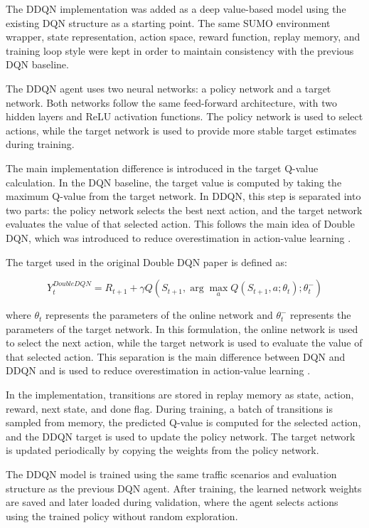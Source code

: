 \documentclass{article}
\begin{document}
The DDQN implementation was added as a deep value-based model using the existing DQN structure as a starting point. The same SUMO environment wrapper, state representation, action space, reward function, replay memory, and training loop style were kept in order to maintain consistency with the previous DQN baseline.

The DDQN agent uses two neural networks: a policy network and a target network. Both networks follow the same feed-forward architecture, with two hidden layers and ReLU activation functions. The policy network is used to select actions, while the target network is used to provide more stable target estimates during training.

The main implementation difference is introduced in the target Q-value calculation. In the DQN baseline, the target value is computed by taking the maximum Q-value from the target network. In DDQN, this step is separated into two parts: the policy network selects the best next action, and the target network evaluates the value of that selected action. This follows the main idea of Double DQN, which was introduced to reduce overestimation in action-value learning \cite{vanhasselt2016deep}.

The target used in the original Double DQN paper is defined as:

\[
Y_t^{DoubleDQN} =
R_{t+1} + \gamma Q\left(S_{t+1},
\arg\max_a Q(S_{t+1}, a; \theta_t);
\theta_t^{-}\right)
\]

where $\theta_t$ represents the parameters of the online network and
$\theta_t^{-}$ represents the parameters of the target network. In this
formulation, the online network is used to select the next action, while
the target network is used to evaluate the value of that selected action.
This separation is the main difference between DQN and DDQN and is used
to reduce overestimation in action-value learning \cite{vanhasselt2016deep}.


In the implementation, transitions are stored in replay memory as state, action, reward, next state, and done flag. During training, a batch of transitions is sampled from memory, the predicted Q-value is computed for the selected action, and the DDQN target is used to update the policy network. The target network is updated periodically by copying the weights from the policy network.

The DDQN model is trained using the same traffic scenarios and evaluation structure as the previous DQN agent. After training, the learned network weights are saved and later loaded during validation, where the agent selects actions using the trained policy without random exploration.
\end{document}
